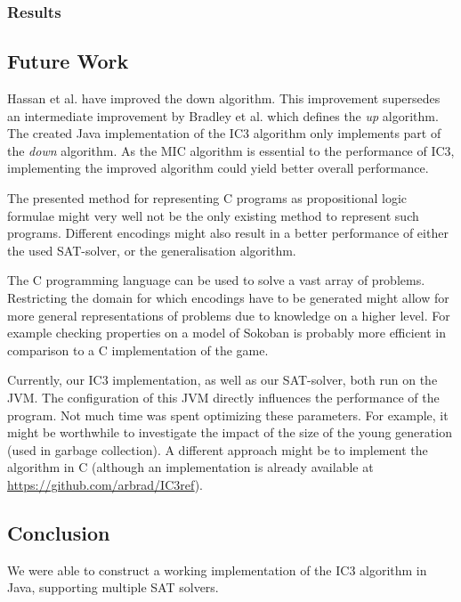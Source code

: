 \documentclass[a4paper]{article}
\begin{document}
\subsubsection{Results}

\subsection{Future Work}
Hassan et al. \cite{Hassan2013} have improved the down algorithm. This improvement supersedes an intermediate improvement by Bradley et al. \cite{Bradley2007} which defines the \emph{up} algorithm. The created Java implementation of the IC3 algorithm only implements part of the \emph{down} algorithm. As the MIC algorithm is essential to the performance of IC3, implementing the improved algorithm could yield better overall performance.

The presented method for representing C programs as propositional logic formulae might very well not be the only existing method to represent such programs. Different encodings might also result in a better performance of either the used SAT-solver, or the generalisation algorithm.

The C programming language can be used to solve a vast array of problems. Restricting the domain for which encodings have to be generated might allow for more general representations of problems due to knowledge on a higher level. For example checking properties on a model of Sokoban is probably more efficient in comparison to a C implementation of the game.

Currently, our IC3 implementation, as well as our SAT-solver, both run on the JVM. The configuration of this JVM directly influences the performance of the program. Not much time was spent optimizing these parameters. For example, it might be worthwhile to investigate the impact of the size of the young generation (used in garbage collection). A different approach might be to implement the algorithm in C (although an implementation is already available at \url{https://github.com/arbrad/IC3ref}).



\subsection{Conclusion}
We were able to construct a working implementation of the IC3 algorithm in Java, supporting multiple SAT solvers.



\end{document}
